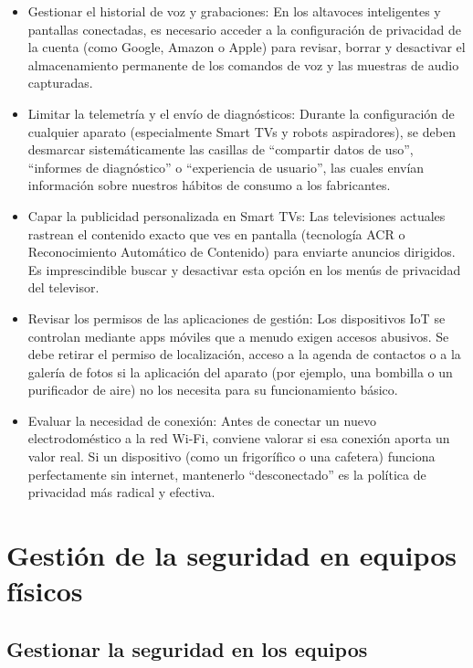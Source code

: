 \documentclass[
  spanish,
  a4paper,
  openany]{book}
\begin{document}
\begin{itemize}
\item
  Gestionar el historial de voz y grabaciones: En los altavoces inteligentes y pantallas conectadas, es necesario acceder a la configuración de privacidad de la cuenta (como Google, Amazon o Apple) para revisar, borrar y desactivar el almacenamiento permanente de los comandos de voz y las muestras de audio capturadas.
\item
  Limitar la telemetría y el envío de diagnósticos: Durante la configuración de cualquier aparato (especialmente Smart TVs y robots aspiradores), se deben desmarcar sistemáticamente las casillas de ``compartir datos de uso'', ``informes de diagnóstico'' o ``experiencia de usuario'', las cuales envían información sobre nuestros hábitos de consumo a los fabricantes.
\item
  Capar la publicidad personalizada en Smart TVs: Las televisiones actuales rastrean el contenido exacto que ves en pantalla (tecnología ACR o Reconocimiento Automático de Contenido) para enviarte anuncios dirigidos. Es imprescindible buscar y desactivar esta opción en los menús de privacidad del televisor.
\item
  Revisar los permisos de las aplicaciones de gestión: Los dispositivos IoT se controlan mediante apps móviles que a menudo exigen accesos abusivos. Se debe retirar el permiso de localización, acceso a la agenda de contactos o a la galería de fotos si la aplicación del aparato (por ejemplo, una bombilla o un purificador de aire) no los necesita para su funcionamiento básico.
\item
  Evaluar la necesidad de conexión: Antes de conectar un nuevo electrodoméstico a la red Wi-Fi, conviene valorar si esa conexión aporta un valor real. Si un dispositivo (como un frigorífico o una cafetera) funciona perfectamente sin internet, mantenerlo ``desconectado'' es la política de privacidad más radical y efectiva.
\end{itemize}

\chapter{Gestión de la seguridad en equipos físicos}\label{gestiuxf3n-de-la-seguridad-en-equipos-fuxedsicos}

\section{Gestionar la seguridad en los equipos}\label{gestionar-la-seguridad-en-los-equipos}
\end{document}
